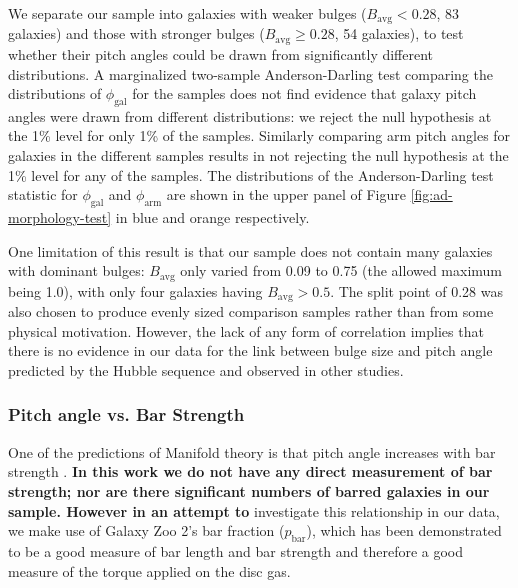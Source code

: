 We separate our sample into galaxies with weaker bulges ($B_\mathrm{avg} < 0.28$, 83 galaxies) and those with stronger bulges ($B_\mathrm{avg} \ge 0.28$, 54 galaxies), to test whether their pitch angles could be drawn from significantly different distributions. A marginalized two-sample Anderson-Darling test comparing the distributions of $\phi_\mathrm{gal}$ for the samples does not find evidence that galaxy pitch angles were drawn from different distributions: we reject the null hypothesis at the 1\% level for only 1\% of the samples. Similarly comparing arm pitch angles for galaxies in the different samples results in not rejecting the null hypothesis at the 1\% level for any of the samples. The distributions of the Anderson-Darling test statistic for $\phi_\mathrm{gal}$ and $\phi_\mathrm{arm}$ are shown in the upper panel of Figure \ref{fig:ad-morphology-test} in blue and orange respectively.

One limitation of this result is that our sample does not contain many galaxies with dominant bulges: $B_\mathrm{avg}$ only varied from 0.09 to 0.75 (the allowed maximum being 1.0), with only four galaxies having $B_\mathrm{avg} > 0.5$. The split point of 0.28 was also chosen to produce evenly sized comparison samples rather than from some physical motivation. However, the lack of any form of correlation implies that there is no evidence in our data for the link between bulge size and pitch angle predicted by the Hubble sequence and observed in other studies.

\subsubsection{Pitch angle vs. Bar Strength}
\label{section:morphology-comparison-bar}

One of the predictions of Manifold theory is that pitch angle increases with bar strength \citep{2009MNRAS.400.1706A}. \textbf{In this work we do not have any direct measurement of bar strength; nor are there significant numbers of barred galaxies in our sample. However in an attempt to} investigate this relationship in our data, we make use of Galaxy Zoo 2's bar fraction ($p_\mathrm{bar}$), which has been demonstrated to be a good measure of bar length \citep{Willett2013:1308.3496v2} and bar strength \citep{2012MNRAS.423.1485S,2012MNRAS.424.2180M,2018MNRAS.473.4731K} and therefore a good measure of the torque applied on the disc gas.

